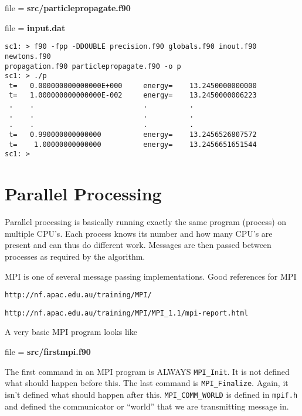 \documentclass[12pt,a4paper,oneside,openany]{report}
\newcommand{\fcode}[1]{\par \small file = \textbf{#1}  \normalsize}
\newcommand{\code}[1]{\texttt{#1}}
\begin{document}
\fcode{src/particlepropagate.f90}

\fcode{input.dat}

\begin{verbatim}
sc1: > f90 -fpp -DDOUBLE precision.f90 globals.f90 inout.f90 newtons.f90
propagation.f90 particlepropagate.f90 -o p
sc1: > ./p
 t=   0.000000000000000E+000     energy=    13.2450000000000     
 t=   1.000000000000000E-002     energy=    13.2450000006223     
 .    .                          .          .
 .    .                          .          .
 .    .                          .          .
 t=   0.990000000000000          energy=    13.2456526807572     
 t=    1.00000000000000          energy=    13.2456651651544     
sc1: >
\end{verbatim}


\newpage

\begin{center}

\end{center}

\newpage

\section*{Parallel Processing}
Parallel processing is basically running exactly the same program (process) on multiple CPU's.  Each process knows its number and how many CPU's are present and can thus do different work.  Messages are then passed between processes as required by the algorithm.

MPI is one of several message passing implementations.  Good references for MPI

\hspace{1cm}\code{http://nf.apac.edu.au/training/MPI/}

\hspace{1cm}\code{http://nf.apac.edu.au/training/MPI/MPI\_1.1/mpi-report.html}

A very basic MPI program looks like

\fcode{src/firstmpi.f90}

The first command in an MPI program is ALWAYS \code{MPI\_Init}.  It is not defined what should happen before this.  The last command is \code{MPI\_Finalize}.  Again, it isn't defined what should happen after this.  \code{MPI\_COMM\_WORLD} is defined in \code{mpif.h} and defined the communicator or ``world'' that we are transmitting message in.
\end{document}
